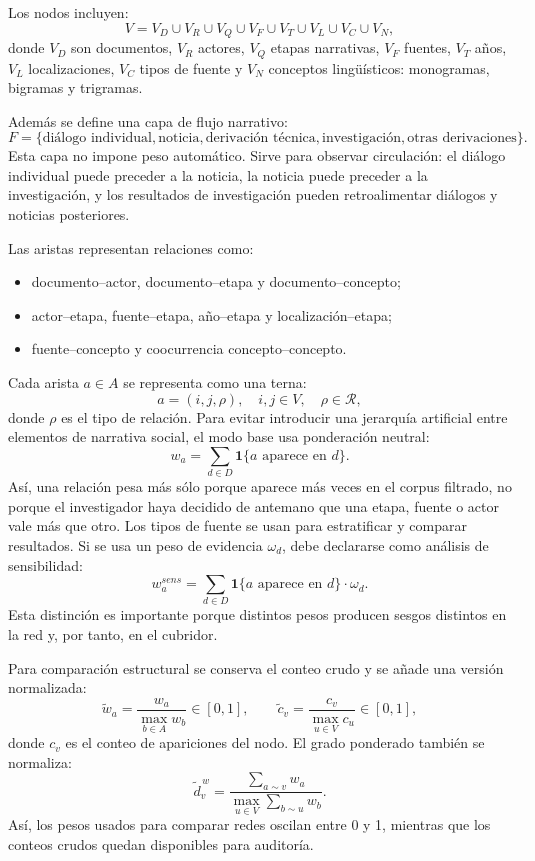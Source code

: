 \documentclass[11pt]{article}
\begin{document}
Los nodos incluyen:
\[
V=V_D\cup V_R\cup V_Q\cup V_F\cup V_T\cup V_L\cup V_C\cup V_N,
\]
donde $V_D$ son documentos, $V_R$ actores, $V_Q$ etapas narrativas, $V_F$
fuentes, $V_T$ años, $V_L$ localizaciones, $V_C$ tipos de fuente y $V_N$
conceptos lingüísticos: monogramas, bigramas y trigramas.

Además se define una capa de flujo narrativo:
\[
F=\{\text{diálogo individual},\text{noticia},\text{derivación técnica},
\text{investigación},\text{otras derivaciones}\}.
\]
Esta capa no impone peso automático. Sirve para observar circulación: el diálogo
individual puede preceder a la noticia, la noticia puede preceder a la
investigación, y los resultados de investigación pueden retroalimentar diálogos
y noticias posteriores.

Las aristas representan relaciones como:
\begin{itemize}
\item documento--actor, documento--etapa y documento--concepto;
\item actor--etapa, fuente--etapa, año--etapa y localización--etapa;
\item fuente--concepto y coocurrencia concepto--concepto.
\end{itemize}
Cada arista $a\in A$ se representa como una terna:
\[
a=(i,j,\rho),\quad i,j\in V,\quad \rho\in{\mathcal R},
\]
donde $\rho$ es el tipo de relación. Para evitar introducir una jerarquía
artificial entre elementos de narrativa social, el modo base usa ponderación
neutral:
\[
w_a = \sum_{d\in D}\mathbf{1}\{a \text{ aparece en } d\}.
\]
Así, una relación pesa más sólo porque aparece más veces en el corpus filtrado,
no porque el investigador haya decidido de antemano que una etapa, fuente o
actor vale más que otro. Los tipos de fuente se usan para estratificar y
comparar resultados. Si se usa un peso de evidencia \(\omega_d\), debe
declararse como análisis de sensibilidad:
\[
w_a^{sens} = \sum_{d\in D}\mathbf{1}\{a \text{ aparece en } d\}\cdot \omega_d.
\]
Esta distinción es importante porque distintos pesos producen sesgos distintos
en la red y, por tanto, en el cubridor.

Para comparación estructural se conserva el conteo crudo y se añade una versión
normalizada:
\[
\widetilde{w}_a=\frac{w_a}{\max_{b\in A}w_b}\in[0,1],
\qquad
\widetilde{c}_v=\frac{c_v}{\max_{u\in V}c_u}\in[0,1],
\]
donde \(c_v\) es el conteo de apariciones del nodo. El grado ponderado también
se normaliza:
\[
\widetilde{d}^{\,w}_v=
\frac{\sum_{a\sim v}w_a}{\max_{u\in V}\sum_{b\sim u}w_b}.
\]
Así, los pesos usados para comparar redes oscilan entre 0 y 1, mientras que los
conteos crudos quedan disponibles para auditoría.
\end{document}
